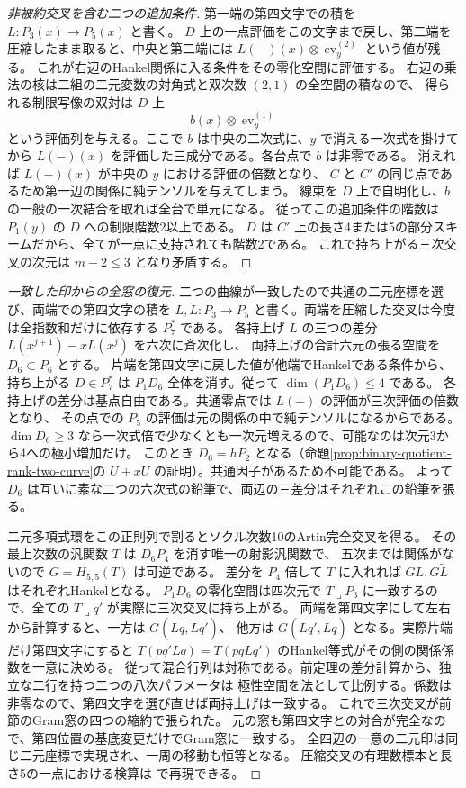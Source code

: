 \begin{proof}[非被約交叉を含む二つの追加条件]
第一端の第四文字での積を $L:P_3(x)\to P_5(x)$ と書く。
$D$ 上の一点評価をこの文字まで戻し、第二端を圧縮したまま取ると、中央と第二端には
$L(-)(x)\otimes\operatorname{ev}_{y}^{(2)}$ という値が残る。
これが右辺のHankel関係に入る条件をその零化空間に評価する。
右辺の乗法の核は二組の二元変数の対角式と双次数 $(2,1)$ の全空間の積なので、
得られる制限写像の双対は $D$ 上
\[
                b(x)\otimes\operatorname{ev}^{(1)}_{y}
\]
という評価列を与える。ここで $b$ は中央の二次式に、$y$ で消える一次式を掛けてから
$L(-)(x)$ を評価した三成分である。各台点で $b$ は非零である。
消えれば $L(-)(x)$ が中央の $y$ における評価の倍数となり、
$C$ と $C'$ の同じ点であるため第一辺の関係に純テンソルを与えてしまう。
線束を $D$ 上で自明化し、$b$ の一般の一次結合を取れば全台で単元になる。
従ってこの追加条件の階数は $P_1(y)$ の $D$ への制限階数2以上である。
$D$ は $C'$ 上の長さ4または5の部分スキームだから、全てが一点に支持されても階数2である。
これで持ち上がる三次交叉の次元は $m-2\le3$ となり矛盾する。
\end{proof}
\begin{proof}[一致した印からの全窓の復元]
二つの曲線が一致したので共通の二元座標を選び、両端での第四文字の積を
$L,\widetilde L:P_3\to P_5$ と書く。両端を圧縮した交叉は今度は全指数和だけに依存する $P_7^*$ である。
各持上げ $L$ の三つの差分 $L(x^{j+1})-xL(x^j)$ を六次に斉次化し、
両持上げの合計六元の張る空間を $D_6\subset P_6$ とする。
片端を第四文字に戻した値が他端でHankelである条件から、持ち上がる $D\in P_7^*$ は
$P_1D_6$ 全体を消す。従って $\dim(P_1D_6)\le4$ である。
各持上げの差分は基点自由である。共通零点では $L(-)$ の評価が三次評価の倍数となり、
その点での $P_5$ の評価は元の関係の中で純テンソルになるからである。
$\dim D_6\ge3$ なら一次式倍で少なくとも一次元増えるので、可能なのは次元3から4への極小増加だけ。
このとき $D_6=hP_2$ となる（命題\ref{prop:binary-quotient-rank-two-curve}の
$U+xU$ の証明）。共通因子があるため不可能である。
よって $D_6$ は互いに素な二つの六次式の鉛筆で、両辺の三差分はそれぞれこの鉛筆を張る。

二元多項式環をこの正則列で割るとソクル次数10のArtin完全交叉を得る。
その最上次数の汎関数 $T$ は $D_6P_4$ を消す唯一の射影汎関数で、
五次までは関係がないので $G=H_{5,5}(T)$ は可逆である。
差分を $P_4$ 倍して $T$ に入れれば $GL,G\widetilde L$ はそれぞれHankelとなる。
$P_1D_6$ の零化空間は四次元で $T\mathbin{\lrcorner}P_3$ に一致するので、全ての
$T\mathbin{\lrcorner}q'$ が実際に三次交叉に持ち上がる。
両端を第四文字にして左右から計算すると、一方は $G(Lq,\widetilde Lq')$、
他方は $G(Lq',\widetilde Lq)$ となる。実際片端だけ第四文字にすると
$T(pq' Lq)=T(pq Lq')$ のHankel等式がその側の関係係数を一意に決める。
従って混合行列は対称である。前定理の差分計算から、独立な二行を持つ二つの八次パラメータは
極性空間を法として比例する。係数は非零なので、第四文字を選び直せば両持上げは一致する。
これで三次交叉が前節のGram窓の四つの縮約で張られた。
元の窓も第四文字との対合が完全なので、第四位置の基底変更だけでGram窓に一致する。
全四辺の一意の二元印は同じ二元座標で実現され、一周の移動も恒等となる。
圧縮交叉の有理数標本と長さ5の一点における検算は
で再現できる。
\end{proof}
